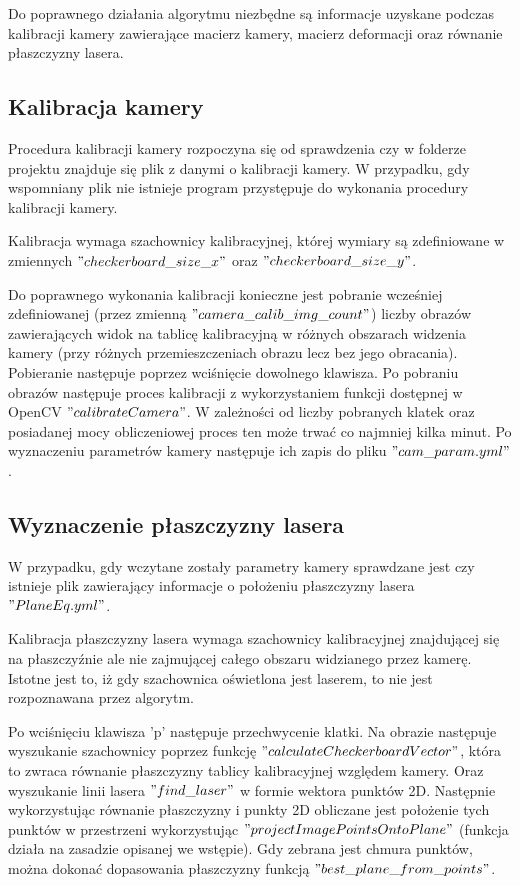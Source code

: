 \documentclass[conference]{IEEEtran}
\begin{document}
Do poprawnego działania algorytmu niezbędne są informacje uzyskane podczas kalibracji kamery zawierające macierz kamery, macierz deformacji oraz równanie płaszczyzny lasera.

\subsection{Kalibracja kamery}

Procedura kalibracji kamery rozpoczyna się od sprawdzenia czy w folderze projektu znajduje się plik z danymi o kalibracji kamery. W przypadku, gdy wspomniany plik nie istnieje program przystępuje do wykonania procedury kalibracji kamery.

Kalibracja wymaga szachownicy kalibracyjnej, której wymiary są zdefiniowane w zmiennych $"checkerboard\_size\_x"$ oraz $"checkerboard\_size\_y"$. 

Do poprawnego wykonania kalibracji konieczne jest pobranie wcześniej zdefiniowanej (przez zmienną $"camera\_calib\_img\_count"$) liczby obrazów zawierających widok na tablicę kalibracyjną w różnych obszarach widzenia kamery (przy różnych przemieszczeniach obrazu lecz bez jego obracania). Pobieranie następuje poprzez wciśnięcie dowolnego klawisza. Po pobraniu obrazów następuje proces kalibracji z wykorzystaniem funkcji dostępnej w OpenCV $"calibrateCamera"$. W zależności od liczby pobranych klatek oraz posiadanej mocy obliczeniowej proces ten może trwać co najmniej kilka minut. Po wyznaczeniu parametrów kamery następuje ich zapis do pliku $"cam\_param.yml"$.

\subsection{Wyznaczenie płaszczyzny lasera}

W przypadku, gdy wczytane zostały parametry kamery sprawdzane jest czy istnieje plik zawierający informacje o położeniu płaszczyzny lasera $"PlaneEq.yml"$.

Kalibracja płaszczyzny lasera wymaga szachownicy kalibracyjnej znajdującej się na płaszczyźnie ale nie zajmującej całego obszaru widzianego przez kamerę. Istotne jest to, iż gdy szachownica oświetlona jest laserem, to nie jest rozpoznawana przez algorytm.

Po wciśnięciu klawisza 'p' następuje przechwycenie klatki. Na obrazie następuje wyszukanie szachownicy poprzez funkcję $"calculateCheckerboardVector"$, która to zwraca równanie płaszczyzny tablicy kalibracyjnej względem kamery. Oraz wyszukanie linii lasera $"find\_laser"$ w formie wektora punktów 2D. Następnie wykorzystując równanie płaszczyzny i punkty 2D obliczane jest położenie tych punktów w przestrzeni wykorzystując $"projectImagePointsOntoPlane"$ (funkcja działa na zasadzie opisanej we wstępie). Gdy zebrana jest chmura punktów, można dokonać dopasowania płaszczyzny funkcją $"best\_plane\_from\_points"$. 
\end{document}
